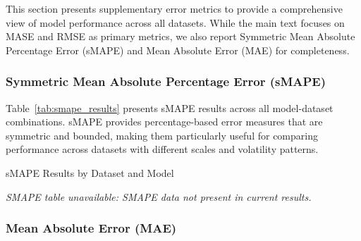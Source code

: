 \documentclass{article}
\begin{document}
\begin{appendices}
This section presents supplementary error metrics to provide a comprehensive view of model performance across all datasets. While the main text focuses on MASE and RMSE as primary metrics, we also report Symmetric Mean Absolute Percentage Error (sMAPE) and Mean Absolute Error (MAE) for completeness.

\subsubsection{Symmetric Mean Absolute Percentage Error (sMAPE)}

Table~\ref{tab:smape_results} presents sMAPE results across all model-dataset combinations. sMAPE provides percentage-based error measures that are symmetric and bounded, making them particularly useful for comparing performance across datasets with different scales and volatility patterns.

\begin{table}[htbp]
\centering
\caption{sMAPE Results by Dataset and Model}
\label{tab:smape_results}
% 
\textit{SMAPE table unavailable: SMAPE data not present in current results.}
\vspace{0.1cm}

\end{table}



\subsubsection{Mean Absolute Error (MAE)}


\end{appendices}
\end{document}
